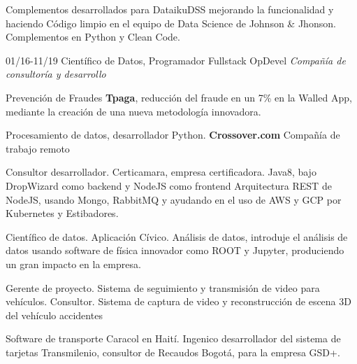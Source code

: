 \begin{entrylist}
{Complementos desarrollados para DataikuDSS mejorando la funcionalidad y haciendo
Código limpio en el equipo de Data Science de Johnson \& Jhonson. Complementos en Python y Clean Code.}

  \entry
    {01/16-11/19}
    {Científico de Datos, Programador Fullstack}
    {OpDevel {\sl Compañía de consultoría y desarrollo}}
    {Prevención de Fraudes \textbf{Tpaga}, reducción del fraude en un 7\% en la Walled App, mediante la
creación de una nueva metodología innovadora.

Procesamiento de datos, desarrollador Python. \textbf{Crossover.com} Compañía de trabajo remoto

Consultor desarrollador. Certicamara, empresa certificadora. Java8, bajo
DropWizard como backend y NodeJS como frontend Arquitectura REST de NodeJS,
usando Mongo, RabbitMQ y ayudando en el uso de AWS y GCP por Kubernetes
y Estibadores.

Científico de datos. Aplicación Cívico. Análisis de datos, introduje el análisis de datos usando
software de física innovador como ROOT y Jupyter, produciendo un gran impacto en
la empresa.

Gerente de proyecto. Sistema de seguimiento y transmisión de video para vehículos.
Consultor. Sistema de captura de video y reconstrucción de escena 3D del vehículo
accidentes


Software de transporte Caracol en Haití. Ingenico desarrollador del sistema de tarjetas Transmilenio,
consultor de Recaudos Bogotá, para la empresa GSD+.}

\end{entrylist}
\newpage
%


